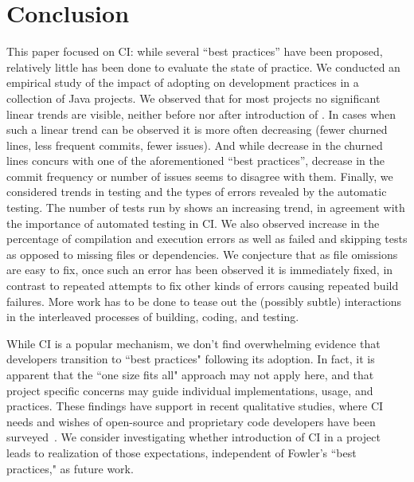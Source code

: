 
\section{Conclusion}
\label{sec:conc}

This paper focused on CI: while several ``best 
practices'' have been proposed, relatively little has been done to evaluate the 
state of practice.
We conducted an 
empirical study of the impact of adopting \Tvis on development practices in a collection of \GH Java projects.
We observed that for most projects no significant linear trends 
are visible, neither before nor after introduction of \Tvis.
In cases when such a linear trend can be observed it is more often decreasing 
(fewer churned lines, less frequent commits, fewer issues). 
And while decrease in the churned lines concurs with one of the aforementioned 
``best practices'', decrease in the commit frequency or number of issues seems 
to disagree with them. 
Finally, we considered trends in testing and the types of errors revealed 
by the automatic testing.
The number of tests run by \Tvis shows an increasing trend, 
in agreement with the importance of automated testing in CI.
We also observed increase in the percentage of compilation and execution errors 
as well as failed and skipping tests as opposed to missing files or dependencies.
We conjecture that as file omissions are easy to fix, once such an error has been 
observed it is immediately fixed, in contrast to repeated attempts to fix other 
kinds of errors causing repeated build failures.
More work has to be done to tease out the (possibly subtle) interactions in the 
interleaved processes of building, coding, and testing.

While CI is a popular mechanism, we don't 
find overwhelming evidence that developers transition to ``best practices" 
following its adoption.
In fact, it is apparent that the ``one size fits all" approach may not apply here, 
and that project specific concerns may guide individual implementations, usage, 
and practices.
These findings have support in recent qualitative studies, where CI needs and 
wishes of open-source and proprietary code developers have been surveyed~\cite{Hilton2016, hilton2016continuous}.
We consider investigating whether introduction of CI in a project leads to 
realization of those expectations, independent of Fowler's ``best practices," 
as future work.
